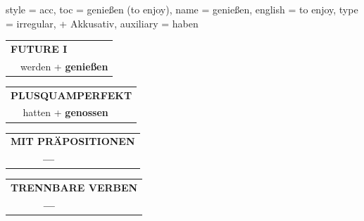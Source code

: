 \begin{verbentry}{
  style = {acc},
  toc = {genießen (to enjoy)},
  name = {genießen},
  english = {to enjoy},
  type = {irregular, + Akkusativ},
  auxiliary = {haben}
}
\begin{tabular}{rl}
    \multicolumn{2}{l}{\textbf{FUTURE I} }\\
  &  werden + \textbf{genießen}\\
 
  \end{tabular}
\hfill
   \begin{tabular}{rl}
      \multicolumn{2}{l}{\textbf{PLUSQUAMPERFEKT}}\\
  &  hatten + \textbf{genossen}\\
  \end{tabular}
  
  
\vspace{10pt}

\begin{tabular}{lll}
\multicolumn{3}{l}{\textbf{MIT PRÄPOSITIONEN}}\\
& \textbf{---} & \\
\end{tabular}
\hfill
\begin{tabular}{lll}
\multicolumn{3}{l}{\textbf{TRENNBARE VERBEN}}\\
& \textbf{---} & \\
\end{tabular}
\vspace{-5pt}
\end{verbentry}

